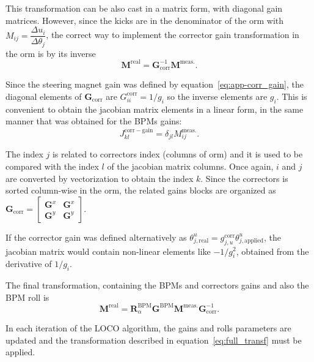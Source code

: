 This transformation can be also cast in a matrix form, with diagonal gain matrices. However, since the kicks are in the denominator of the \gls{orm} with $M_{ij} = \dfrac{\Delta u_i}{\Delta \theta_j}$, the correct way to implement the corrector gain transformation in the \gls{orm} is by its inverse
\begin{equation}
        \mathbf{M}^{\mathrm{real}} = \mathbf{G}^{-1}_{\mathrm{corr}} \mathbf{M}^{\mathrm{meas.}}.
\end{equation}

Since the steering magnet gain was defined by equation~\eqref{eq:app-corr_gain}, the diagonal elements of $\mathbf{G}_{\mathrm{corr}}$ are $G^{\mathrm{corr}}_{ii} = 1/g_{i}$ so the inverse elements are $g_{i}$. This is convenient to obtain the jacobian matrix elements in a linear form, in the same manner that was obtained for the BPMs gains:
\begin{equation}
    J_{kl}^{\mathrm{corr}-\mathrm{gain}} = \delta_{jl}M^{\mathrm{meas.}}_{ij}.
\end{equation}

The index $j$ is related to correctors index (columns of \gls{orm}) and it is used to be compared with the index $l$ of the jacobian matrix columns. Once again, $i$ and $j$ are converted by vectorization to obtain the index $k$. Since the correctors is sorted column-wise in the \gls{orm}, the related gains blocks are organized as $\mathbf{G}_{\mathrm{corr}} =
    \begin{bmatrix}
    \mathbf{G}^x & \mathbf{G}^x \\
    \mathbf{G}^y & \mathbf{G}^y
    \end{bmatrix}$.

If the corrector gain was defined alternatively as $\theta_{j, \mathrm{real}}^u = g_{j, u}^{\mathrm{corr}}\theta_{j, \mathrm{applied}}^u$, the jacobian matrix would contain non-linear elements like $-1/g_{i}^2$, obtained from the derivative of $1/g_{i}$.

The final transformation, containing the BPMs and correctors gains and also the BPM roll is
\begin{equation}
    \mathbf{M}^{\mathrm{real}} = \mathbf{R}^\mathrm{BPM}_\alpha\mathbf{G}^{\mathrm{BPM}} \mathbf{M}^{\mathrm{meas.}}\mathbf{G}^{-1}_{\mathrm{corr}}.
    \label{eq:full_transf}
\end{equation}

In each iteration of the LOCO algorithm, the gains and rolls parameters are updated and the transformation described in equation~\eqref{eq:full_transf} must be applied.

